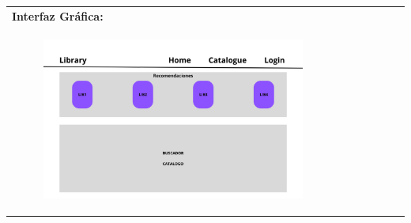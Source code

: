 \documentclass{report}
\begin{document}
\begin{center}
\begin{longtable}{|p{\linewidth}|}
                \textbf{Interfaz Gráfica:}\\
                \begin{figure}[H]
                    \centering
                    \includegraphics[width=0.8\textwidth]{./img/grafico/recom_lib.png}
                \end{figure}\\
                \hline
            \end{longtable}
        \end{center}
        \clearpage
\end{document}
